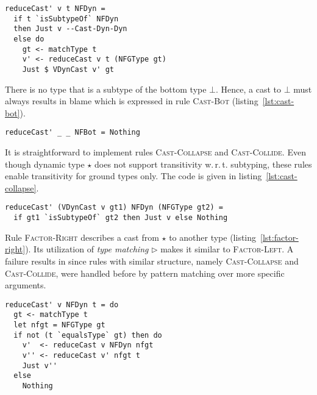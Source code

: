 \begin{lstlisting}[float,
  label=lst:cast-dyn-dyn-factor-left,
  caption=Haskell: Rules \textsc{Cast-Dyn-Dyn} and \\ \textsc{Factor-Left} (\texttt{Interpreter.hs})]
reduceCast' v t NFDyn =
  if t `isSubtypeOf` NFDyn
  then Just v --Cast-Dyn-Dyn
  else do
    gt <- matchType t
    v' <- reduceCast v t (NFGType gt)
    Just $ VDynCast v' gt
\end{lstlisting}

There is no type that is a subtype of the bottom type $\bot$. Hence, a cast to $\bot$ must always results in blame which is expressed in rule \textsc{Cast-Bot} (listing~\ref{lst:cast-bot}).

\begin{lstlisting}[float,
	caption=Haskell: Rule \textsc{Cast-Bot} (\texttt{Interpreter.hs}),
	label=lst:cast-bot]
reduceCast' _ _ NFBot = Nothing
\end{lstlisting}

It is straightforward to implement rules \textsc{Cast-Collapse} and \textsc{Cast-Collide}. Even though dynamic type $\star$ does not support transitivity w.\,r.\,t. subtyping, these rules enable transitivity for ground types only. The code is given in listing~\ref{lst:cast-collapse}.

\begin{lstlisting}[float,
  caption=Haskell: Rules \textsc{Cast-Collapse} and \\ \textsc{Cast-Collide} (\texttt{Interpreter.hs}),
  label=lst:cast-collapse]
reduceCast' (VDynCast v gt1) NFDyn (NFGType gt2) =
  if gt1 `isSubtypeOf` gt2 then Just v else Nothing
\end{lstlisting}

Rule \textsc{Factor-Right} describes a cast from $\star$ to another type (listing~\ref{lst:factor-right}). Its utilization of \emph{type matching} $\rhd$ makes it similar to \textsc{Factor-Left}. A failure results in \blame since rules with similar structure, namely \textsc{Cast-Collapse} and \textsc{Cast-Collide}, were handled before by pattern matching over more specific arguments.

\begin{lstlisting}[float,
  caption=Haskell: Rule \textsc{Factor-Right} (\texttt{Interpreter.hs}),
  label=lst:factor-right]
reduceCast' v NFDyn t = do
  gt <- matchType t
  let nfgt = NFGType gt
  if not (t `equalsType` gt) then do
    v'  <- reduceCast v NFDyn nfgt
    v'' <- reduceCast v' nfgt t
    Just v''
  else
    Nothing
\end{lstlisting}

